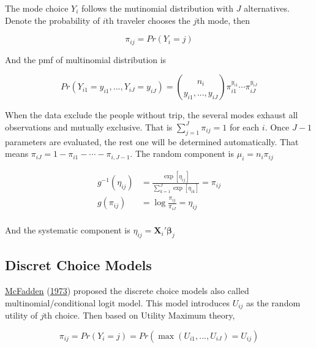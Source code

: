 \documentclass[
  11pt,
  openany]{memoir}
\begin{document}
The mode choice \(Y_i\) follows the mutinomial distribution with \(J\) alternatives.
Denote the probability of \(i\)th traveler chooses the \(j\)th mode, then

\begin{equation}
\pi_{ij}=Pr(Y_i=j)
\end{equation}

And the pmf of multinomial distribution is

\begin{equation}
Pr(Y_{i1}=y_{i1}, ..., Y_{iJ}=y_{iJ})= {n_i \choose y_{i1},..., y_{iJ} }
\pi_{i1}^{y_{i1}} \cdots \pi_{iJ}^{y_{iJ}}
\end{equation}

When the data exclude the people without trip, the several modes exhaust all observations and mutually exclusive. That is \(\sum_{j=1}^J\pi_{ij}=1\) for each \(i\). Once \(J-1\) parameters are evaluated, the rest one will be determined automatically. That means \(\pi_{iJ}=1-\pi_{i1}-\cdots-\pi_{i,J-1}\).
The random component is \(\mu_i=n_i\pi_{ij}\)

\begin{equation}
\begin{split}
g^{-1}(\eta_{ij})&=\frac{\exp[\eta_{ij}]}{\sum_{k=1}^J\exp[\eta_{ik}]}=\pi_{ij}\\
g(\pi_{ij})&=\log\frac{\pi_{ij}}{\pi_{iJ}}=\eta_{ij}\\
\end{split}
\label{eq:mlogit-link}
\end{equation}

And the systematic component is \(\eta_{ij}=\mathbf{X}_i'\boldsymbol\beta_j\)

\hypertarget{discret-choice-models}{%
\subsection{Discret Choice Models}\label{discret-choice-models}}

\protect\hyperlink{ref-mcfaddenConditionalLogitAnalysis1973}{McFadden} (\protect\hyperlink{ref-mcfaddenConditionalLogitAnalysis1973}{1973}) proposed the discrete choice models also called multinomial/conditional logit model.
This model introduces \(U_{ij}\) as the random utility of \(j\)th choice. Then based on Utility Maximum theory,

\begin{equation}
\pi_{ij}=Pr(Y_i=j)=Pr(\max(U_{i1},...,U_{iJ})=U_{ij})
\end{equation}
\end{document}
